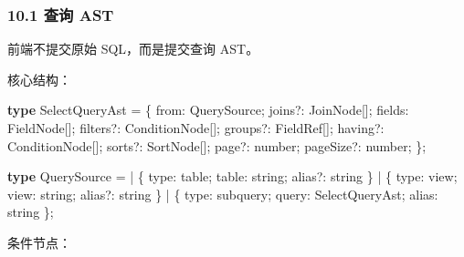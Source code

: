 \documentclass[
  a4paper,
  UTF8]{ctexart}
\newenvironment{Shaded}{}{}
\newcommand{\DataTypeTok}[1]{\textcolor[rgb]{0.56,0.13,0.00}{#1}}
\newcommand{\KeywordTok}[1]{\textcolor[rgb]{0.00,0.44,0.13}{\textbf{#1}}}
\newcommand{\NormalTok}[1]{#1}
\newcommand{\OperatorTok}[1]{\textcolor[rgb]{0.40,0.40,0.40}{#1}}
\newcommand{\StringTok}[1]{\textcolor[rgb]{0.25,0.44,0.63}{#1}}
\begin{document}
\hypertarget{ux67e5ux8be2-ast}{%
\subsubsection{10.1 查询 AST}\label{ux67e5ux8be2-ast}}

前端不提交原始 SQL，而是提交查询 AST。

核心结构：

\begin{Shaded}
\begin{Highlighting}[]
\KeywordTok{type}\NormalTok{ SelectQueryAst }\OperatorTok{=}\NormalTok{ \{}
\NormalTok{  from}\OperatorTok{:}\NormalTok{ QuerySource}\OperatorTok{;}
\NormalTok{  joins}\OperatorTok{?:}\NormalTok{ JoinNode[]}\OperatorTok{;}
\NormalTok{  fields}\OperatorTok{:}\NormalTok{ FieldNode[]}\OperatorTok{;}
\NormalTok{  filters}\OperatorTok{?:}\NormalTok{ ConditionNode[]}\OperatorTok{;}
\NormalTok{  groups}\OperatorTok{?:}\NormalTok{ FieldRef[]}\OperatorTok{;}
\NormalTok{  having}\OperatorTok{?:}\NormalTok{ ConditionNode[]}\OperatorTok{;}
\NormalTok{  sorts}\OperatorTok{?:}\NormalTok{ SortNode[]}\OperatorTok{;}
\NormalTok{  page}\OperatorTok{?:} \DataTypeTok{number}\OperatorTok{;}
\NormalTok{  pageSize}\OperatorTok{?:} \DataTypeTok{number}\OperatorTok{;}
\NormalTok{\}}\OperatorTok{;}

\KeywordTok{type}\NormalTok{ QuerySource }\OperatorTok{=}
  \OperatorTok{|}\NormalTok{ \{ type}\OperatorTok{:} \StringTok{\textquotesingle{}table\textquotesingle{}}\OperatorTok{;}\NormalTok{ table}\OperatorTok{:} \DataTypeTok{string}\OperatorTok{;}\NormalTok{ alias}\OperatorTok{?:} \DataTypeTok{string}\NormalTok{ \}}
  \OperatorTok{|}\NormalTok{ \{ type}\OperatorTok{:} \StringTok{\textquotesingle{}view\textquotesingle{}}\OperatorTok{;}\NormalTok{ view}\OperatorTok{:} \DataTypeTok{string}\OperatorTok{;}\NormalTok{ alias}\OperatorTok{?:} \DataTypeTok{string}\NormalTok{ \}}
  \OperatorTok{|}\NormalTok{ \{ type}\OperatorTok{:} \StringTok{\textquotesingle{}subquery\textquotesingle{}}\OperatorTok{;}\NormalTok{ query}\OperatorTok{:}\NormalTok{ SelectQueryAst}\OperatorTok{;}\NormalTok{ alias}\OperatorTok{:} \DataTypeTok{string}\NormalTok{ \}}\OperatorTok{;}
\end{Highlighting}
\end{Shaded}

条件节点：
\end{document}
